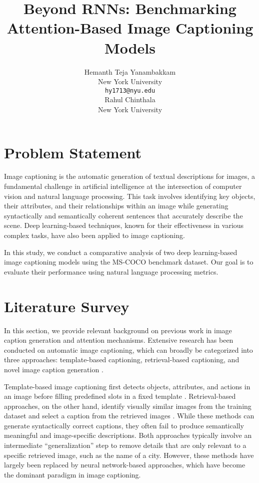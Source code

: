 \documentclass{article}
\title{Beyond RNNs: Benchmarking Attention-Based Image Captioning Models}
\author{
    Hemanth Teja Yanambakkam \\
    New York University \\
    \texttt{hy1713@nyu.edu} \\
    \And
    Rahul Chinthala \\
    New York University
}
\begin{document}
\maketitle
\thispagestyle{empty}

\section{Problem Statement}
 
Image captioning is the automatic generation of textual descriptions for images, a fundamental challenge in artificial intelligence at the intersection of computer vision and natural language processing. This task involves identifying key objects, their attributes, and their relationships within an image while generating syntactically and semantically coherent sentences that accurately describe the scene. Deep learning-based techniques, known for their effectiveness in various complex tasks, have also been applied to image captioning.

In this study, we conduct a comparative analysis of two deep learning-based image captioning models using the MS-COCO benchmark dataset. Our goal is to evaluate their performance using natural language processing metrics.

\section{Literature Survey}

In this section, we provide relevant background on previous work in image caption generation and attention mechanisms. Extensive research has been conducted on automatic image captioning, which can broadly be categorized into three approaches: template-based captioning, retrieval-based captioning, and novel image caption generation \cite{xu2015}.
  
Template-based image captioning first detects objects, attributes, and actions in an image before filling predefined slots in a fixed template \cite{shetty2017}. Retrieval-based approaches, on the other hand, identify visually similar images from the training dataset and select a caption from the retrieved images \cite{lin2014}. While these methods can generate syntactically correct captions, they often fail to produce semantically meaningful and image-specific descriptions. Both approaches typically involve an intermediate “generalization” step to remove details that are only relevant to a specific retrieved image, such as the name of a city. However, these methods have largely been replaced by neural network-based approaches, which have become the dominant paradigm in image captioning.
\end{document}
